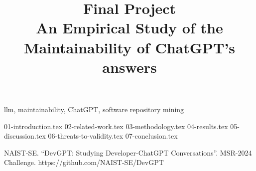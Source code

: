 \documentclass[conference]{IEEEtran}
\begin{document}
\title{Final Project\\
{\footnotesize An Empirical Study of the Maintainability of ChatGPT's answers}
}

\author{
}

\maketitle

\begin{abstract}
\end{abstract}

\begin{IEEEkeywords}
    llm, maintainability, ChatGPT, software repository mining
\end{IEEEkeywords}


{01-introduction.tex}
{02-related-work.tex}
{03-methodology.tex}
{04-results.tex}
{05-discussion.tex}
{06-threats-to-validity.tex}
{07-conclusion.tex}


\begin{thebibliography}{00}
     NAIST-SE. ``DevGPT: Studying Developer-ChatGPT Conversations''. MSR-2024 Challenge. https://github.com/NAIST-SE/DevGPT

\end{thebibliography}
\end{document}
